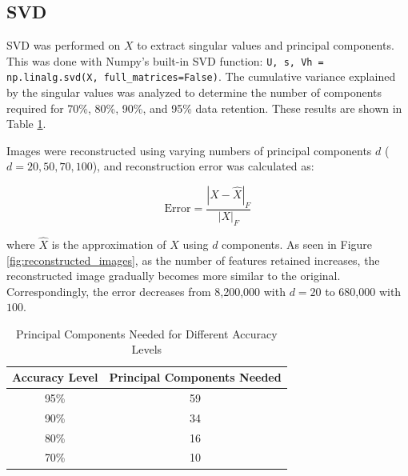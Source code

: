 \documentclass[conference]{IEEEtran}
\begin{document}
\subsection{SVD}
SVD was performed on $X$ to extract singular values and principal components. This was done with Numpy's built-in SVD function: \texttt{U, s, Vh = np.linalg.svd(X, full\_matrices=False)}. The cumulative variance explained by the singular values was analyzed to determine the number of components required for 70\%, 80\%, 90\%, and 95\% data retention. These results are shown in Table \ref{tab:principal_components}.

Images were reconstructed using varying numbers of principal components $d$ ($d=20,50,70,100$), and reconstruction error was calculated as: 

\[\text{Error} = \frac{|X - \hat{X}|_F}{|X|_F}\]

where $\hat{X}$ is the approximation of $X$ using $d$ components. As seen in Figure \ref{fig:reconstructed_images}, as the number of features retained increases, the reconstructed image gradually becomes more similar to the original. Correspondingly, the error decreases from 8,200,000 with $d=20$ to 680,000 with $100$.


\begin{table}[h!]
\centering
\begin{tabular}{|c|c|}
\hline
\textbf{Accuracy Level} & \textbf{Principal Components Needed} \\ \hline
95\%                     & 59                                   \\ \hline
90\%                     & 34                                   \\ \hline
80\%                     & 16                                   \\ \hline
70\%                     & 10                                   \\ \hline
\end{tabular}
\caption{Principal Components Needed for Different Accuracy Levels}
\label{tab:principal_components}
\end{table}
\end{document}
